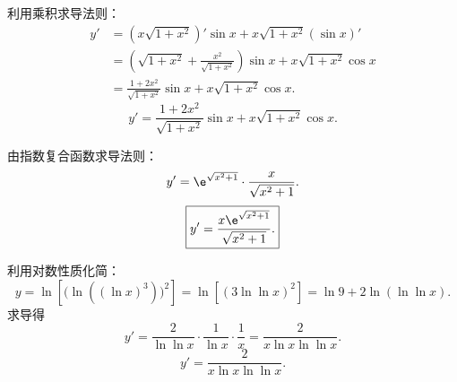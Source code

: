 \begin{solution}

    利用乘积求导法则：
    \begin{equation}
        \begin{aligned}
            y' & = (x\sqrt{1+x^2})'\sin x + x\sqrt{1+x^2}(\sin x)'                                    \\
               & = \left( \sqrt{1+x^2} + \frac{x^2}{\sqrt{1+x^2}} \right)\sin x + x\sqrt{1+x^2}\cos x \\
               & = \frac{1+2x^2}{\sqrt{1+x^2}}\sin x + x\sqrt{1+x^2}\cos x.
        \end{aligned}
    \end{equation}
    \begin{equation}
        \boxed{y' = \frac{1+2x^2}{\sqrt{1+x^2}}\sin x + x\sqrt{1+x^2}\cos x.}
    \end{equation}


    由指数复合函数求导法则：
    \begin{equation}
        y' = \e^{\sqrt{x^2+1}} \cdot \frac{x}{\sqrt{x^2+1}}.
    \end{equation}
    \begin{equation}
        \boxed{y' = \frac{x\e^{\sqrt{x^2+1}}}{\sqrt{x^2+1}}.}
    \end{equation}


    利用对数性质化简：
    \begin{equation}
        y = \ln\left[ \bigl(\ln((\ln x)^3)\bigr)^2 \right] = \ln\left[ (3\ln\ln x)^2 \right] = \ln 9 + 2\ln(\ln\ln x).
    \end{equation}
    求导得
    \begin{equation}
        y' = \frac{2}{\ln\ln x} \cdot \frac{1}{\ln x} \cdot \frac{1}{x} = \frac{2}{x\ln x \ln\ln x}.
    \end{equation}
    \begin{equation}
        \boxed{y' = \frac{2}{x\ln x \ln\ln x}.}
    \end{equation}



\end{solution}
